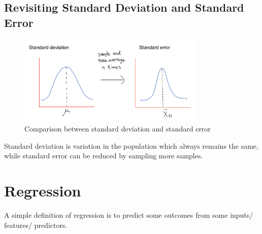 \subsection{Revisiting Standard Deviation and Standard Error}
\begin{figure}[ht]
  \begin{center}
    \includegraphics[width=0.8\textwidth]{figures/sd_se.jpg}
    \caption{Comparison between standard deviation and standard error}
    \label{fig:example_figure}
  \end{center}
\end{figure}

Standard deviation is variation in the population which always remains the same, while standard error can be reduced by sampling more samples.

\section{Regression}

A simple definition of regression is to predict some outcomes from some inputs/ features/ predictors.

